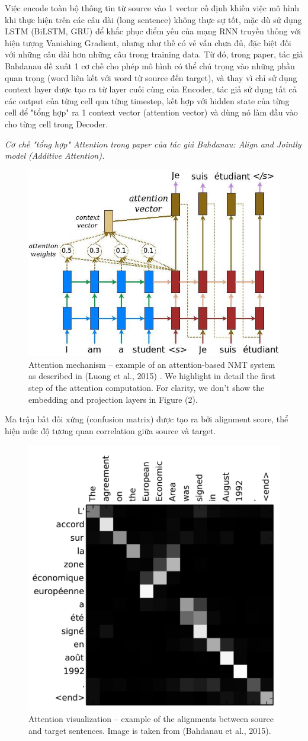 \documentclass[preprint,12pt]{elsarticle}
\begin{document}
Việc encode toàn bộ thông tin từ source vào 1 vector cố định khiến việc mô hình khi thực hiện trên các câu dài (long sentence) không thực sự tốt, mặc dù sử dụng LSTM (BiLSTM, GRU) để khắc phục điểm yếu của mạng RNN truyền thống với hiện tượng Vanishing Gradient, nhưng như thế có vẻ vẫn chưa đủ, đặc biệt đối với những câu dài hơn những câu trong training data. Từ đó, trong paper, tác giả Bahdanau đề xuất 1 cơ chế cho phép mô hình có thể chú trọng vào những phần quan trọng (word liên kết với word từ source đến target), và thay vì chỉ sử dụng context layer được tạo ra từ layer cuối cùng của Encoder, tác giả sử dụng tất cả các output của từng cell qua từng timestep, kết hợp với hidden state của từng cell để "tổng hợp" ra 1 context vector (attention vector) và dùng nó làm đầu vào cho từng cell trong Decoder. 

\emph{Cơ chế "tổng hợp" Attention trong paper của tác giả Bahdanau: Align and Jointly model (Additive Attention).}

\begin{figure}[H]
\centering\includegraphics[width=0.3\linewidth]{img/attention_mechanism.jpg}
\caption{Attention mechanism – example of an attention-based NMT system as described in (Luong et al., 2015) . We highlight in detail the first step of the attention computation. For clarity, we don't show the embedding and projection layers in Figure (2).}
\end{figure}

Ma trận bất đối xứng (confusion matrix) được tạo ra bởi alignment score, thể hiện mức độ tương quan correlation giữa source và target.

\begin{figure}[H]
\centering\includegraphics[width=0.3\linewidth]{img/attention_vis.jpg}
\caption{Attention visualization – example of the alignments between source and target sentences. Image is taken from (Bahdanau et al., 2015).}
\end{figure}
\end{document}
